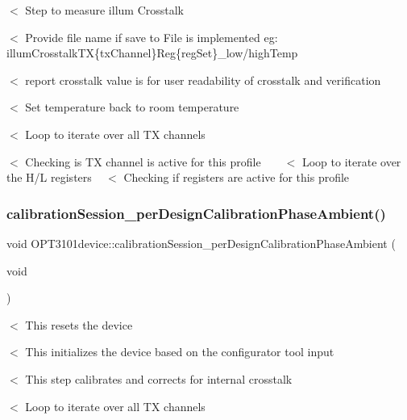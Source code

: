 $<$ Step to measure illum Crosstalk

$<$ Provide file name if save to File is implemented eg\+: illum\+Crosstalk\+TX\{tx\+Channel\}Reg\{reg\+Set\}\+\_\+low/high\+Temp

$<$ report crosstalk value is for user readability of crosstalk and verification

$<$ Set temperature back to room temperature

$<$ Loop to iterate over all TX channels

$<$ Checking is TX channel is active for this profile ~\newline
~\newline
 $<$ Loop to iterate over the H/L registers ~\newline
 $<$ Checking if registers are active for this profile \mbox{\label{class_o_p_t3101device_aee76419eb68c21ce03cb92818d485a6a}} 
\subsubsection{\texorpdfstring{calibration\+Session\+\_\+per\+Design\+Calibration\+Phase\+Ambient()}{calibrationSession\_perDesignCalibrationPhaseAmbient()}}
{\footnotesize\ttfamily void O\+P\+T3101device\+::calibration\+Session\+\_\+per\+Design\+Calibration\+Phase\+Ambient (\begin{DoxyParamCaption}\item[{void}]{ }\end{DoxyParamCaption})}

$<$ This resets the device

$<$ This initializes the device based on the configurator tool input

$<$ This step calibrates and corrects for internal crosstalk

$<$ Loop to iterate over all TX channels

